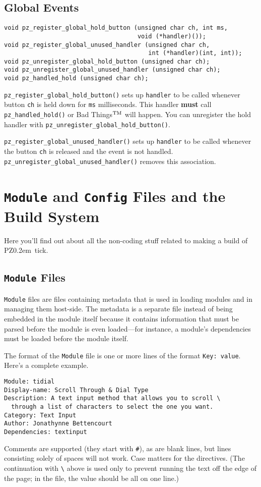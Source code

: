 \documentclass[12pt,letterpaper]{report}
\def\pz{{\footnotesize PZ}}
\def\pzt{\pz\kern0.2em{\large\oldstyle2}}
\let\ttt\tt
\def\tt{\def\_{{\ttt\char`\_}}\ttt}
\def\texttt#1{{\tt #1}}
\begin{document}
\section{Global Events}
\begin{verbatim}
void pz_register_global_hold_button (unsigned char ch, int ms,
                                     void (*handler)());
void pz_register_global_unused_handler (unsigned char ch,
                                        int (*handler)(int, int));
void pz_unregister_global_hold_button (unsigned char ch);
void pz_unregister_global_unused_handler (unsigned char ch);
void pz_handled_hold (unsigned char ch);
\end{verbatim}

\verb|pz_register_global_hold_button()| sets up \verb|handler| to be called
whenever button \verb|ch| is held down for \verb|ms| milliseconds. This handler
{\bf must} call \verb|pz_handled_hold()| or Bad Things$^{\rm TM}$ will happen.
You can unregister the hold handler with \verb|pz_unregister_global_hold_button()|.

\verb|pz_register_global_unused_handler()| sets up \verb|handler| to be called
whenever the button \verb|ch| is released and the event is not handled.
\verb|pz_|\hskip0pt\verb|unregister_|\hskip0pt\verb|global_unused_handler()| removes this association.

\chapter{\texttt{Module} and \texttt{Config} Files and the Build System}
Here you'll find out about all the non-coding stuff related to making a build of \pzt\ tick.

\section{\texttt{Module} Files}\label{moddesc}
\verb|Module| files are files containing metadata that is used in loading modules and in managing
them host-side.
The metadata is a separate file instead of being embedded in the module itself because it contains information
that must be parsed before the module is even loaded---for instance, a module's dependencies
must be loaded before the module itself.

The format of the \verb|Module| file is one or more lines of the format \verb|Key: value|.
Here's a complete example.
\begin{verbatim}
Module: tidial
Display-name: Scroll Through & Dial Type
Description: A text input method that allows you to scroll \
  through a list of characters to select the one you want.
Category: Text Input
Author: Jonathynne Bettencourt
Dependencies: textinput
\end{verbatim}
Comments are supported (they start with \verb|#|),
as are blank lines, but lines consisting solely of spaces will not work.
Case matters for the directives. (The continuation with \verb|\| above is used
only to prevent running the text off the edge of the page; in the file, the
value should be all on one line.)
\end{document}
